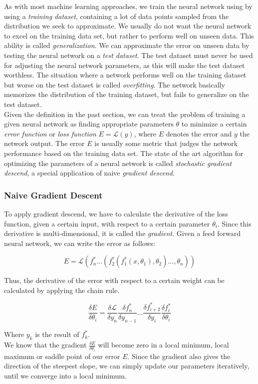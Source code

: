 As with most machine learning approaches, we train the neural  network using by using a \textit{training dataset}, containing a lot of data points sampled from the distribution we seek to approximate. We usually do not want the neural network to excel on the training data set, but rather to perform well on unseen data. This ability is called \textit{generalization}. We can approximate the error on unseen data by testing the neural network on a \textit{test dataset}. The test dataset must never be used for adjusting the neural network parameters, as this will make the test dataset worthless. The situation where a network performs well on the training dataset but worse on the test dataset is called \textit{overfitting}. The network basically memorizes the distribution of the training dataset, but fails to generalize on the test dataset. \\
Given the definition in the past section, we can treat the problem of training a given neural network as finding appropriate parameters $\theta$ to minimize a certain \textit{error function} or \textit{loss function} $E = \mathcal{L}(y)$, where $E$ denotes the error and $y$ the network output. The error $E$ is usually some metric that judges the network performance based on the training data set. The state of the art algorithm for optimizing the parameters of a neural network is called \textit{stochastic gradient descend}, a special application of naive \textit{gradient descend}.
\subsubsection{Naive Gradient Descent}
To apply gradient descend, we have to calculate the derivative of the loss function, given a certain input, with respect to a certain parameter $\theta_i$. Since this derivative is multi-dimensional, it is called the \textit{gradient}. Given a feed forward neural network, we can write the error as follows:

\[
E = \mathcal{L}(f^*_n \dots (f^*_2(f^*_1(x, \theta_1), \theta_2) \dots, \theta_n))
\]

Thus, the derivative of the error with respect to a certain weight can be calculated by applying the chain rule.  

\[
\frac{\delta E}{\delta \theta_i} = 
	\frac{\delta \mathcal{L}}{\delta y_n}
	\frac{\delta f^*_n}{\delta y_{n - 1}}
	\dots
	\frac{\delta f^*_{i + 2}}{\delta y_i}
	\frac{\delta f^*_i}{\delta \theta_i}
\]

Where $y_k$ is the result of $f^*_k$. \\
We know that the gradient $\frac{\delta E}{\delta \theta_i}$ will become zero in a local minimum, local maximum or saddle point of our error $E$. Since the gradient also gives the direction of the steepest slope, we can simply update our parameters iteratively, until we converge into a local minimum. 

